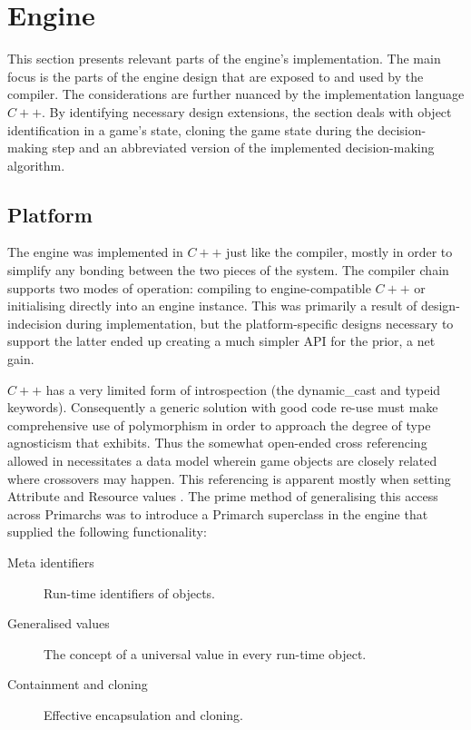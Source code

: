 \section{Engine}
This section presents relevant parts of the engine's implementation. The main focus is the parts of the engine design that are exposed to and used by the compiler. The considerations are further nuanced by the implementation language $C++$. By identifying necessary design extensions, the section deals with object identification in a game's state, cloning the game state during the decision-making step and an abbreviated version of the implemented decision-making algorithm.

\subsection{Platform}
The engine was implemented in $C++$ just like the compiler, %
mostly in order to simplify any bonding between the two pieces of the system. The compiler chain supports two modes of operation: compiling to engine-compatible $C++$ or initialising directly into an engine instance. This was primarily a result of design-indecision during implementation, but the platform-specific designs necessary to support the latter ended up creating a much simpler API for the prior, a net gain.

$C++$ has a very limited form of introspection (the dynamic\_cast and typeid keywords). Consequently a generic solution with good code re-use must make comprehensive use of polymorphism in order to approach the degree of type agnosticism that \langname{} exhibits. Thus the somewhat open-ended cross referencing allowed in \langname{} necessitates a data model wherein game objects are closely related where crossovers may happen. This referencing is apparent mostly when setting Attribute and Resource values . The prime method of generalising this access across Primarchs was to introduce a Primarch superclass in the engine that supplied the following functionality:
\begin{description}
	\item[Meta identifiers] Run-time identifiers of objects.
	\item[Generalised values] The concept of a universal value in every run-time object.
	\item[Containment and cloning] Effective encapsulation and cloning.
\end{description}


